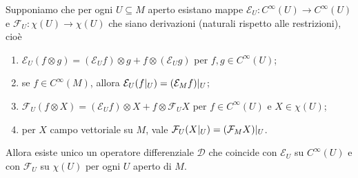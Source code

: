 \begin{theorem} \label{thm:EsistenzaOperatoriDifferenziali}
	Supponiamo che per ogni $U\subseteq M$ aperto esistano mappe $\mathcal E_U : C^\infty(U) \to C^\infty(U)$ e $\mathcal F_U : \chi(U) \to \chi(U)$ che siano derivazioni (naturali rispetto alle restrizioni), cioè
	\begin{enumerate}
		\item $\mathcal E_U(f\otimes g) = (\mathcal E_U f) \otimes g + f \otimes (\mathcal E_U g)$ per $f,g\in C^\infty(U)$; \label{eod:LeibnitzPerE}
		\item se $f\in C^\infty(M)$, allora $\mathcal E_U(f|_ U) = (\mathcal E_M f)|_ U$; \label{eod:LocalitaPerE}
		\item $\mathcal F_U(f\otimes X) = (\mathcal E_U f) \otimes X + f\otimes \mathcal F_U X$ per $f\in C^\infty(U)$ e $X\in\chi(U)$; \label{eod:LeibnitzPerF}
		\item per $X$ campo vettoriale su $M$, vale $\mathcal F_U(X|_ U) = (\mathcal F_M X)|_ U$. \label{eod:LocalitaPerF}
	\end{enumerate}
	Allora esiste unico un operatore differenziale $\mathcal D$ che coincide con $\mathcal E_U$ su $C^\infty(U)$ e con $\mathcal F_U$ su $\chi(U)$ per ogni $U$ aperto di $M$.

\end{theorem}

